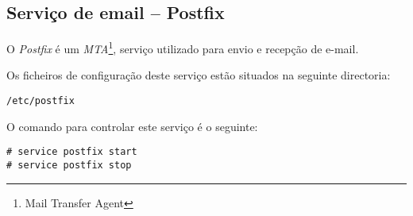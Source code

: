 \subsection{Serviço de email -- Postfix}

O \emph{Postfix} é um \emph{MTA}\footnote{Mail Transfer Agent}, serviço utilizado para envio
e recepção de e-mail.

Os ficheiros de configuração deste serviço estão situados na seguinte directoria:

\begin{Verbatim}[commandchars=\\\{\}]
/etc/postfix
\end{Verbatim}

O comando para controlar este serviço é o seguinte:

\begin{Verbatim}[commandchars=\\\{\}]
# service postfix start
# service postfix stop
\end{Verbatim}

